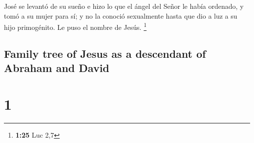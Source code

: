 \begin{paracol}{2}
 José se levantó de su sueño e hizo lo que el ángel del
Señor le había ordenado, y tomó a su mujer para sí;  y no
la conoció sexualmente hasta que dio a luz a su hijo primogénito. Le
puso el nombre de Jesús. \footnote{\textbf{1:25} Luc 2,7}

\switchcolumn
\begin{otherlanguage}{english}

\hypertarget{family-tree-of-jesus-as-a-descendant-of-abraham-and-david}{%
\subsection{Family tree of Jesus as a descendant of Abraham and
David}\label{family-tree-of-jesus-as-a-descendant-of-abraham-and-david}}

\hypertarget{section-1}{%
\section{1}\label{section-1}}


\end{otherlanguage}
\end{paracol}
